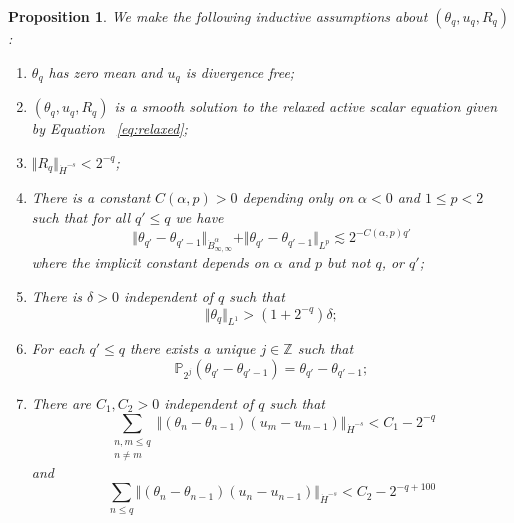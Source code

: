 \documentclass[12pt,reqno,letterpaper]{amsart}
\numberwithin{equation}{section}
\newcommand{\1}{{\bf 1}}
\newcommand{\2}{{\bf 2}}
\newcommand{\Z}{\mathbb Z}
\newtheorem{proposition}[theorem]{Proposition}
\theoremstyle{remark}
\theoremstyle{remark}
\begin{document}
\begin{proposition}\label{prop:ind}
    We make the following inductive assumptions about $(\theta_q,u_q,R_q)$:
    \begin{enumerate}
        \item\label{i:1} $\theta_q$ has zero mean and $u_q$ is divergence free;
        \item\label{i:2} $(\theta_q,u_q,R_q)$ is a smooth solution to the relaxed active scalar equation given by Equation ~\eqref{eq:relaxed};
        \item\label{i:3} $\Vert R_q \Vert_{\dot{H}^{-s}} < 2^{-q}$;
        \item\label{i:4} There is a constant $C(\alpha,p) > 0$ depending only on $\alpha < 0$ and $1 \leq p < 2$ such that for all $q' \leq q$ we have
        $$
        \Vert \theta_{q'} - \theta_{q'-1} \Vert_{\dot{B}^\alpha_{\infty,\infty}} + \Vert \theta_{q'} - \theta_{q'-1} \Vert_{L^p} \lesssim 2^{-C(\alpha,p)q'}
        $$
        where the implicit constant depends on $\alpha$ and $p$ but not $q$, or $q'$;
        \item\label{i:5} There is $\delta > 0$ independent of $q$ such that
        $$
        \Vert \theta_q \Vert_{L^1} > (1 + 2^{-q})\delta;
        $$
        \item\label{i:6} For each $q' \leq q$ there exists a unique $j \in \Z$ such that
        $$
        \mathbb{P}_{2^j}(\theta_{q'} - \theta_{q'-1}) = \theta_{q'} - \theta_{q'-1};
        $$
        \item\label{i:7} There are $C_1,C_2 > 0$ independent of $q$ such that
        $$
        \sum_{\substack{n,m \leq q\\ n \not  = m}} \Vert (\theta_n - \theta_{n-1}) (u_m - u_{m-1}) \Vert_{\dot{H}^{-s}} < C_1 - 2^{-q}
        $$
        and
        $$
         \sum_{n \leq q} \Vert (\theta_n - \theta_{n-1}) (u_n - u_{n-1}) \Vert_{\dot{H}^{-s}} < C_2 - 2^{-q + 100}
        $$
    \end{enumerate}
\end{proposition}
\end{document}

